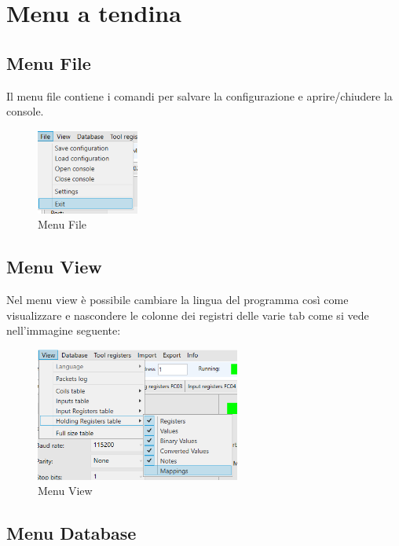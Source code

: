 
\chapter{Menu a tendina}

\section{Menu File}

Il menu file contiene i comandi per salvare la configurazione e aprire/chiudere la console.

\begin{figure}[H]
\centering
\includegraphics[width=0.3\textwidth]{../Img/Menu_File.PNG}
\caption{Menu File}
\end{figure}

\section{Menu View}

Nel menu view è possibile cambiare la lingua del programma così come visualizzare e
nascondere le colonne dei registri delle varie tab come si vede nell'immagine seguente:

\begin{figure}[H]
\centering
\includegraphics[width=0.6\textwidth]{../Img/Menu_View.PNG}
\caption{Menu View}
\end{figure}

\section{Menu Database}

